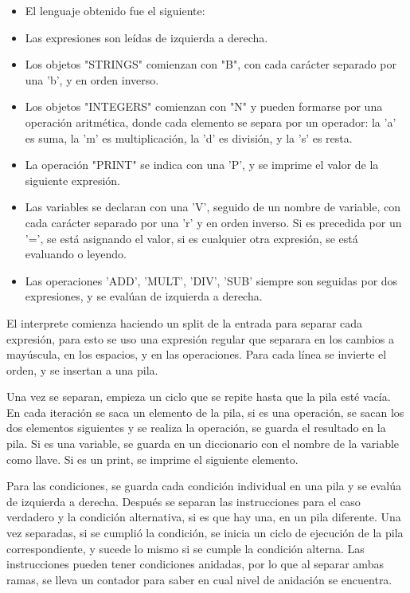 \documentclass{article}
\begin{document}
\begin{itemize}
  \item El lenguaje obtenido fue el siguiente:
  \item Las expresiones son leídas de izquierda a derecha.
  \item Los objetos "STRINGS" comienzan con "B", con cada carácter separado por una 'b', y en orden inverso.
  \item Los objetos "INTEGERS" comienzan con "N" y pueden formarse por una operación aritmética, donde cada elemento se separa por un operador: la 'a' es suma, la 'm' es multiplicación, la 'd' es división, y la 's' es resta.
  \item La operación "PRINT" se indica con una 'P', y se imprime el valor de la siguiente expresión.
  \item Las variables se declaran con una 'V', seguido de un nombre de variable, con cada carácter separado por una 'r' y en orden inverso. Si es precedida por un '=', se está asignando el valor, si es cualquier otra expresión, se está evaluando o leyendo.
  \item Las operaciones 'ADD', 'MULT', 'DIV', 'SUB' siempre son seguidas por dos expresiones, y se evalúan de izquierda a derecha.
\end{itemize}

El interprete comienza haciendo un split de la entrada para separar cada expresión, para esto se uso una expresión regular que separara en los cambios a mayúscula, en los espacios, y en las operaciones. Para cada línea se invierte el orden, y se insertan a
una pila.

Una vez se separan, empieza un ciclo que se repite hasta que la pila esté vacía. En cada iteración se saca un elemento de la pila, si es una operación, se sacan los dos elementos siguientes y se realiza la operación, se guarda el resultado en la pila. Si es una variable, se guarda en un diccionario con el nombre de la variable como llave. Si es un print, se imprime el siguiente elemento.

Para las condiciones, se guarda cada condición individual en una pila y se evalúa de izquierda a derecha. Después se separan las instrucciones para el caso verdadero y la condición alternativa, si es que hay una, en un pila diferente. Una vez separadas, si se cumplió la condición, se inicia un ciclo de ejecución de la pila correspondiente, y sucede lo mismo si se cumple la condición alterna. Las instrucciones pueden tener condiciones anidadas, por lo que al separar ambas ramas, se lleva un contador para saber en cual nivel de anidación se encuentra.
\end{document}

